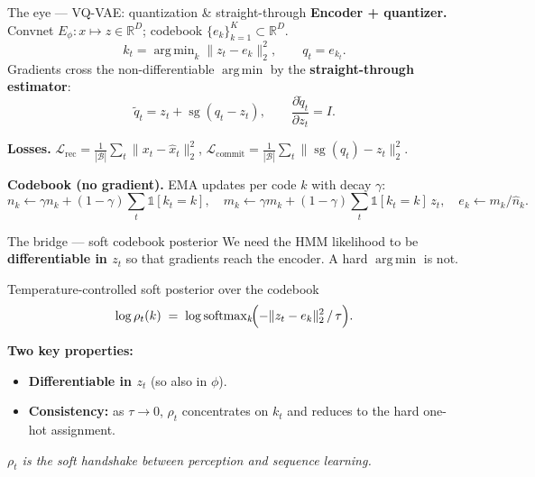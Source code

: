 \documentclass[aspectratio=169,10pt]{beamer}
\DeclareMathOperator*{\argmin}{arg\,min}
\newcommand{\sg}{\operatorname{sg}}
\newcommand{\R}{\mathbb{R}}
\newcommand{\Lcal}{\mathcal{L}}
\begin{document}
\begin{frame}{The eye --- VQ-VAE: quantization \& straight-through}
  \textbf{Encoder + quantizer.}\; Convnet $E_\phi: x \mapsto z \in \R^{D}$;
  codebook $\{e_k\}_{k=1}^{K}\subset\R^{D}$.
  \[
    k_t = \argmin_k \|z_t - e_k\|_2^2, \qquad q_t = e_{k_t}.
  \]
  Gradients cross the non-differentiable $\argmin$ by the \textbf{straight-through estimator}:
  \[
    \tilde q_t = z_t + \sg(q_t - z_t),
    \qquad
    \frac{\partial \tilde q_t}{\partial z_t} = I.
  \]

  \textbf{Losses.}\quad
  $\Lcal_{\text{rec}} = \tfrac{1}{|\mathcal{B}|}\sum_t \|x_t - \hat x_t\|_2^2$,
  \quad
  $\Lcal_{\text{commit}} = \tfrac{1}{|\mathcal{B}|}\sum_t \|\sg(q_t) - z_t\|_2^2$.

  \vspace{0.4em}
  \textbf{Codebook (no gradient).}\; EMA updates per code $k$ with decay $\gamma$:
  \[
    n_k \leftarrow \gamma n_k + (1-\gamma)\!\sum_t \mathbb{1}[k_t=k],\quad
    m_k \leftarrow \gamma m_k + (1-\gamma)\!\sum_t \mathbb{1}[k_t=k]\,z_t,\quad
    e_k \leftarrow m_k / \hat n_k.
  \]
\end{frame}

\begin{frame}{The bridge --- soft codebook posterior}
  We need the HMM likelihood to be \textbf{differentiable in $z_t$} so that
  gradients reach the encoder. A hard $\argmin$ is not.

  \vspace{0.3em}
  \begin{block}{Temperature-controlled soft posterior over the codebook}
    \[
      \log \rho_t(k) \;=\; \log\mathrm{softmax}_k\!\Bigl(-\|z_t - e_k\|_2^2 \,/\, \tau\Bigr).
    \]
  \end{block}

  \vspace{0.3em}
  \textbf{Two key properties:}
  \begin{itemize}\setlength\itemsep{0.35em}
    \item \textbf{Differentiable in $z_t$} (so also in $\phi$).
    \item \textbf{Consistency:} as $\tau\to 0$, $\rho_t$ concentrates on
          $k_t$ and reduces to the hard one-hot assignment.
  \end{itemize}

  \vspace{0.4em}
  \begin{center}\itshape\color{deepblue}
    $\rho_t$ is the soft handshake between perception and sequence learning.
  \end{center}
\end{frame}
\end{document}
